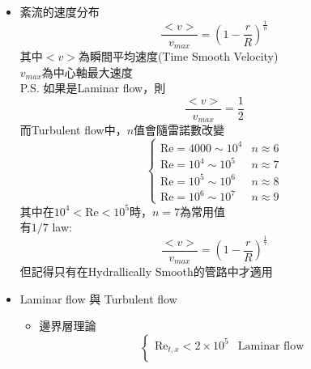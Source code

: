 \documentclass[../main.tex]{subfiles}
\begin{document}
\begin{itemize}
\begin{itemize}
    當管徑越大，相對粗糙度越小，可以想成通過的等密度流線數量越多\\
    至於為什麼laminar flow不受相對粗糙度影響，可以想成流體的慣性力太小\\
    流體會能以繞過去的方式流動，不會被凸起物影響\\
    反之，turbulent flow慣性力大，會以撞擊方式撞凸起物產生渦流，影響整體流動\\
    而$\kappa \propto f_F,\quad f_T \propto \frac{1}{D}, \quad f_F \propto \frac{\kappa}{D}$\\
    而圖中最下面一條線，代表完全平滑(Hydrallically Smooth)的管路
  \end{itemize}
  \item 紊流的速度分布
  \begin{equation}
    \boxed{
      \frac{<v>}{v_{max}} = \left(
        1 - \frac{r}{R}
      \right)^{\frac{1}{n}}}
  \end{equation}
  其中$<v>$為瞬間平均速度(Time Smooth Velocity)\\
  $v_{max}$為中心軸最大速度\\
  P.S. 如果是Laminar flow，則
  \begin{equation}
    \frac{<v>}{v_{max}} = \frac{1}{2}
  \end{equation}
  而Turbulent flow中，$n$值會隨雷諾數改變
  \begin{equation}
    \begin{cases}
      \text{Re} = 4000\sim 10^4 & n \approx 6 \\
      \text{Re} = 10^4\sim 10^5 & n \approx 7 \\
      \text{Re} = 10^5\sim 10^6 & n \approx 8 \\
      \text{Re} = 10^6\sim 10^7 & n \approx 9
    \end{cases}
  \end{equation}
  其中在$10^4 < \text{Re} < 10^5$時，$n=7$為常用值\\
  有$1/7$ law:
  \begin{equation}
    \frac{<v>}{v_{max}} = \left(
      1 - \frac{r}{R}
    \right)^{\frac{1}{7}}
  \end{equation}
  但記得只有在Hydrallically Smooth的管路中才適用
  \item Laminar flow 與 Turbulent flow
  \begin{itemize}
    \item 邊界層理論
    \begin{equation}
      \begin{cases}
        \text{Re}_{t,x} < 2\times 10^{5} & \text{Laminar flow} \\

\end{cases}
\end{equation}
\end{itemize}
\end{itemize}
\end{document}
